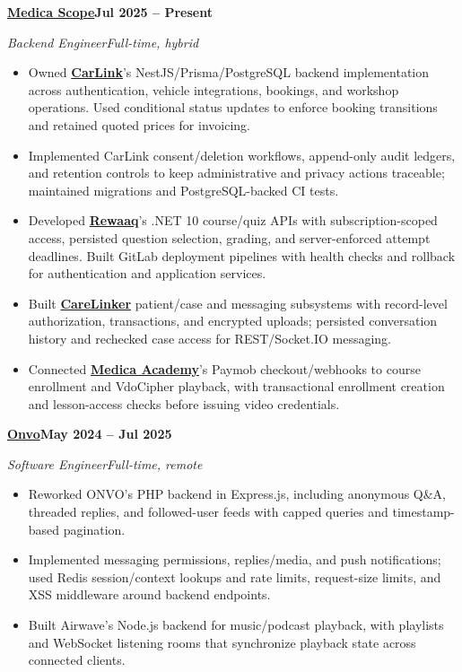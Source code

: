 \documentclass[letterpaper,11pt]{article}
\newcommand{\role}[4]{%
  \par\addvspace{9pt}%
  \Needspace{5\baselineskip}%
  \textbf{#1}\hfill\textbf{#2}\par
  \textit{#3\enspace\textbar\enspace#4}\par
}
\begin{document}
\role{\href{https://medicascopehms.com/}{Medica Scope}}{Jul 2025 -- Present}
  {Backend Engineer}{Full-time, hybrid}
\begin{itemize}
  \item Owned \href{https://carlink.dev/}{\textbf{CarLink}}'s NestJS/Prisma/PostgreSQL backend implementation across authentication, vehicle integrations, bookings, and workshop operations. Used conditional status updates to enforce booking transitions and retained quoted prices for invoicing.
  \item Implemented CarLink consent/deletion workflows, append-only audit ledgers, and retention controls to keep administrative and privacy actions traceable; maintained migrations and PostgreSQL-backed CI tests.
  \item Developed \href{https://rewaaq.com/landing/}{\textbf{Rewaaq}}'s .NET 10 course/quiz APIs with subscription-scoped access, persisted question selection, grading, and server-enforced attempt deadlines. Built GitLab deployment pipelines with health checks and rollback for authentication and application services.
  \item Built \href{https://carelinker.ai/en}{\textbf{CareLinker}} patient/case and messaging subsystems with record-level authorization, transactions, and encrypted uploads; persisted conversation history and rechecked case access for REST/Socket.IO messaging.
  \item Connected \href{https://medicaacademy.com/}{\textbf{Medica Academy}}'s Paymob checkout/webhooks to course enrollment and VdoCipher playback, with transactional enrollment creation and lesson-access checks before issuing video credentials.
\end{itemize}

\role{\href{https://onvo.me/}{Onvo}}{May 2024 -- Jul 2025}
  {Software Engineer}{Full-time, remote}
\begin{itemize}
  \item Reworked ONVO's PHP backend in Express.js, including anonymous Q\&A, threaded replies, and followed-user feeds with capped queries and timestamp-based pagination.
  \item Implemented messaging permissions, replies/media, and push notifications; used Redis session/context lookups and rate limits, request-size limits, and XSS middleware around backend endpoints.
  \item Built Airwave's Node.js backend for music/podcast playback, with playlists and WebSocket listening rooms that synchronize playback state across connected clients.
\end{itemize}
\end{document}
